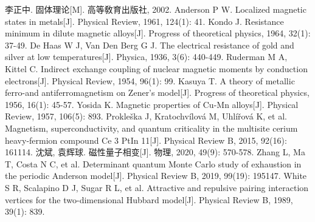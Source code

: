 \begin{thebibliography}{20}
  李正中. 固体理论[M]. 高等敎育出版社, 2002.
 Anderson P W. Localized magnetic states in metals[J]. Physical Review, 1961, 124(1): 41.
 Kondo J. Resistance minimum in dilute magnetic alloys[J]. Progress of theoretical physics, 1964, 32(1): 37-49.
 De Haas W J, Van Den Berg G J. The electrical resistance of gold and silver at low temperatures[J]. Physica, 1936, 3(6): 440-449.
 Ruderman M A, Kittel C. Indirect exchange coupling of nuclear magnetic moments by conduction electrons[J]. Physical Review, 1954, 96(1): 99.
 Kasuya T. A theory of metallic ferro-and antiferromagnetism on Zener's model[J]. Progress of theoretical physics, 1956, 16(1): 45-57.
 Yosida K. Magnetic properties of Cu-Mn alloys[J]. Physical Review, 1957, 106(5): 893.
 Prokleška J, Kratochvílová M, Uhlířová K, et al. Magnetism, superconductivity, and quantum criticality in the multisite cerium heavy-fermion compound Ce 3 PtIn 11[J]. Physical Review B, 2015, 92(16): 161114.
 沈斌, 袁辉球. 磁性量子相变[J]. 物理, 2020, 49(9): 570-578.
 Zhang L, Ma T, Costa N C, et al. Determinant quantum Monte Carlo study of exhaustion in the periodic Anderson model[J]. Physical Review B, 2019, 99(19): 195147.
 White S R, Scalapino D J, Sugar R L, et al. Attractive and repulsive pairing interaction vertices for the two-dimensional Hubbard model[J]. Physical Review B, 1989, 39(1): 839.

\end{thebibliography}
